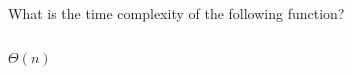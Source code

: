 \begin{prob}
    What is the time complexity of the following function?

    \inputminted{python}{./code.py}

    \begin{soln}
        $\Theta(n)$
    \end{soln}

\end{prob}
